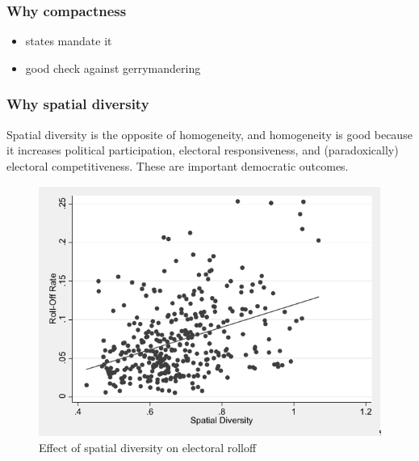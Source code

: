 \documentclass[]{article}
\providecommand{\tightlist}{%
  \setlength{\itemsep}{0pt}\setlength{\parskip}{0pt}}
\begin{document}
\hypertarget{why-compactness}{%
\subsubsection{Why compactness}\label{why-compactness}}

\begin{itemize}
\tightlist
\item
  states mandate it
\item
  good check against gerrymandering
\end{itemize}

\hypertarget{why-spatial-diversity}{%
\subsubsection{Why spatial diversity}\label{why-spatial-diversity}}

Spatial diversity is the opposite of homogeneity, and homogeneity is
good because it increases political participation, electoral
responsiveness, and (paradoxically) electoral competitiveness. These are
important democratic outcomes.

\begin{figure}
\centering
\includegraphics{img/sd_rolloff.png}
\caption{Effect of spatial diversity on electoral rolloff}
\end{figure}
\end{document}

